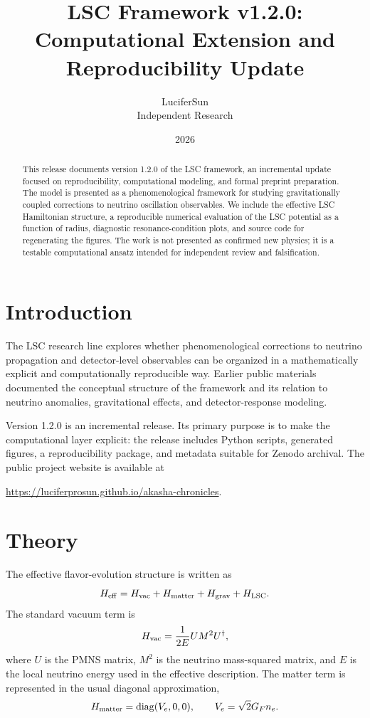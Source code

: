 \documentclass[11pt]{article}
\title{LSC Framework v1.2.0: Computational Extension and Reproducibility Update}
\author{LuciferSun \\ Independent Research}
\date{2026}
\begin{document}
\maketitle

\begin{abstract}
This release documents version 1.2.0 of the LSC framework, an incremental update focused on reproducibility, computational modeling, and formal preprint preparation. The model is presented as a phenomenological framework for studying gravitationally coupled corrections to neutrino oscillation observables. We include the effective LSC Hamiltonian structure, a reproducible numerical evaluation of the LSC potential as a function of radius, diagnostic resonance-condition plots, and source code for regenerating the figures. The work is not presented as confirmed new physics; it is a testable computational ansatz intended for independent review and falsification.
\end{abstract}

\section{Introduction}

The LSC research line explores whether phenomenological corrections to neutrino propagation and detector-level observables can be organized in a mathematically explicit and computationally reproducible way. Earlier public materials documented the conceptual structure of the framework and its relation to neutrino anomalies, gravitational effects, and detector-response modeling.

Version 1.2.0 is an incremental release. Its primary purpose is to make the computational layer explicit: the release includes Python scripts, generated figures, a reproducibility package, and metadata suitable for Zenodo archival. The public project website is available at
\begin{center}
\url{https://luciferprosun.github.io/akasha-chronicles}.
\end{center}

\section{Theory}

The effective flavor-evolution structure is written as
\begin{equation}
 H_{\rm eff}=H_{\rm vac}+H_{\rm matter}+H_{\rm grav}+H_{\rm LSC}.
\end{equation}
The standard vacuum term is
\begin{equation}
 H_{\rm vac}=\frac{1}{2E}U M^2 U^\dagger,
\end{equation}
where $U$ is the PMNS matrix, $M^2$ is the neutrino mass-squared matrix, and $E$ is the local neutrino energy used in the effective description. The matter term is represented in the usual diagonal approximation,
\begin{equation}
 H_{\rm matter}=\operatorname{diag}(V_e,0,0),
 \qquad
 V_e=\sqrt{2}G_F n_e .
\end{equation}
\end{document}
